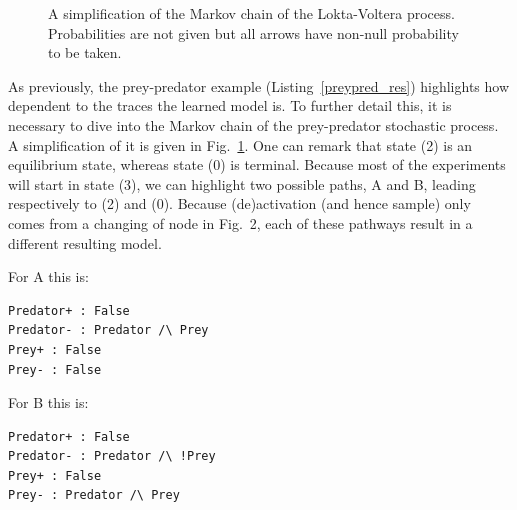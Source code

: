 \documentclass{llncs}
\begin{document}
\begin{figure}[htpb]
	\centering
	\caption{A simplification of the Markov chain of the Lokta-Voltera process. Probabilities are not given but all arrows have non-null probability to be taken.\label{fig:mc-lv}}
\end{figure}

As previously, the prey-predator example (Listing~\ref{preypred_res}) highlights how dependent to the traces the learned model is.
To further detail this, it is necessary to dive into the Markov chain of the prey-predator stochastic process. A simplification of it is given in Fig.~\ref{fig:mc-lv}. One can remark that state (2) is an equilibrium state, whereas state (0) is terminal. Because most of the experiments will start in state (3), we can highlight two possible paths, A and B, leading respectively to (2) and (0). Because (de)activation (and hence sample) only comes from a changing of node in Fig.~2, each of these pathways result in a different resulting model.

\begin{minipage}{.45\textwidth}
\vspace{1em}
For A this is:
\begin{verbatim}
Predator+ : False
Predator- : Predator /\ Prey
Prey+ : False
Prey- : False
\end{verbatim}
\vspace{1em}
\end{minipage}
\begin{minipage}{.45\textwidth}
\vspace{1em}
For B this is:
\begin{verbatim}
Predator+ : False
Predator- : Predator /\ !Prey
Prey+ : False
Prey- : Predator /\ Prey
\end{verbatim}
\vspace{1em}
\end{minipage}
\end{document}
